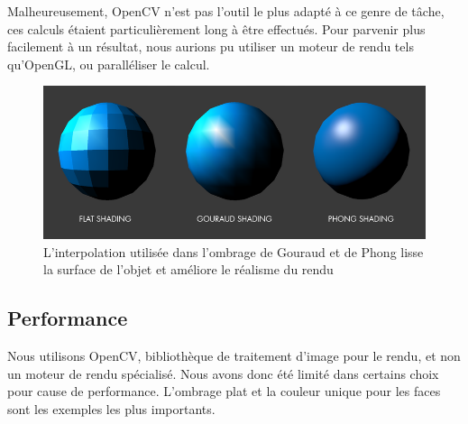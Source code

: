     Malheureusement, OpenCV n'est pas l'outil le plus adapté à ce genre de tâche, ces calculs étaient particulièrement long à être effectués. Pour parvenir plus facilement à un résultat, nous aurions pu utiliser un moteur de rendu tels qu'OpenGL, ou paralléliser le calcul.

    \begin{figure}[!h]
        \centering
        \includegraphics[scale=0.25]{img/shading.png}
        \caption{L'interpolation utilisée dans l'ombrage de Gouraud et de Phong lisse la surface de l'objet et améliore le réalisme du rendu}
    \end{figure}

    \subsection{Performance}

    Nous utilisons OpenCV, bibliothèque de traitement d'image pour le rendu, et non un moteur de rendu spécialisé. Nous avons donc été limité dans certains choix pour cause de performance. L'ombrage plat et la couleur unique pour les faces sont les exemples les plus importants.